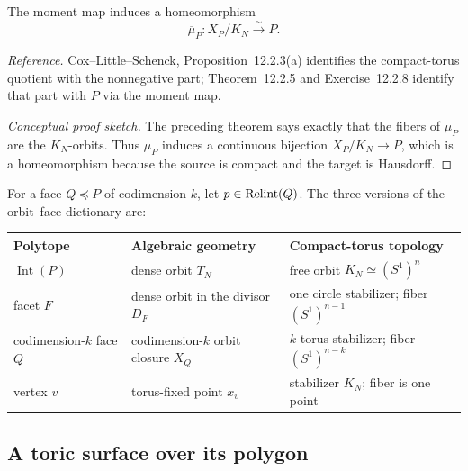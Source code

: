 \begin{corollary}
\label{cor:polytope-compact-orbit-space}
The moment map induces a homeomorphism
\[
\boxed{
\overline{\mu}_P:X_P/K_N\xrightarrow{\ \sim\ }P.
}
\]
\end{corollary}

\noindent
\textit{Reference.}
Cox--Little--Schenck, Proposition~12.2.3(a) identifies the compact-torus
quotient with the nonnegative part; Theorem~12.2.5 and
Exercise~12.2.8 identify that part with \(P\) via the moment map.

\begin{proof}[Conceptual proof sketch]
The preceding theorem says exactly that the fibers of \(\mu_P\) are
the \(K_N\)-orbits. Thus \(\mu_P\) induces a continuous bijection
\(X_P/K_N\to P\), which is a homeomorphism because the source is
compact and the target is Hausdorff.
\end{proof}

\begin{threedictionaries}
For a face \(Q\preceq P\) of codimension \(k\), let
\(p\in\operatorname{Relint}(Q)\). The three versions of the
orbit--face dictionary are:

\medskip

\begin{center}
\small
\begin{tabularx}{\linewidth}{@{}
  >{\raggedright\arraybackslash}X
  >{\raggedright\arraybackslash}X
  >{\raggedright\arraybackslash}X@{}}
\toprule
\textbf{Polytope}
&
\textbf{Algebraic geometry}
&
\textbf{Compact-torus topology}
\\
\midrule
\(\operatorname{Int}(P)\)
&
dense orbit \(T_N\)
&
free orbit \(K_N\simeq(S^1)^n\)
\\[1mm]
facet \(F\)
&
dense orbit in the divisor \(D_F\)
&
one circle stabilizer; fiber \((S^1)^{n-1}\)
\\[1mm]
codimension-\(k\) face \(Q\)
&
codimension-\(k\) orbit closure \(X_Q\)
&
\(k\)-torus stabilizer; fiber \((S^1)^{n-k}\)
\\[1mm]
vertex \(v\)
&
torus-fixed point \(x_v\)
&
stabilizer \(K_N\); fiber is one point
\\
\bottomrule
\end{tabularx}
\end{center}
\end{threedictionaries}

\subsection{A toric surface over its polygon}

